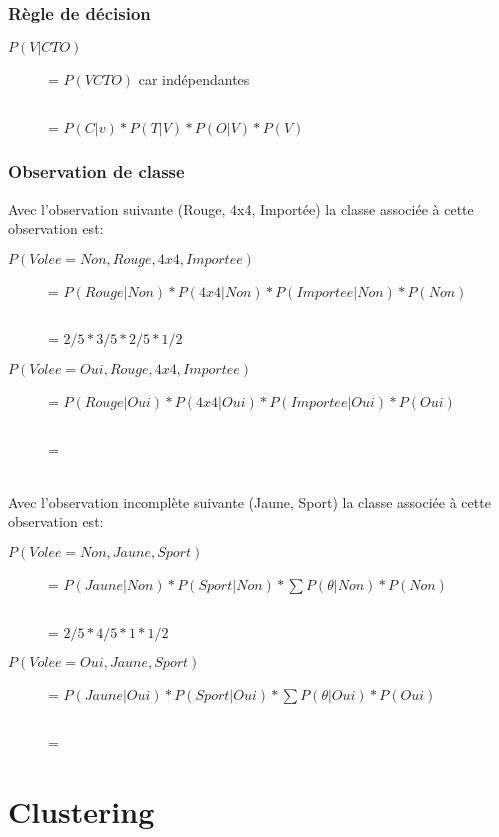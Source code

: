 \subsection{Règle de décision}
\begin{description}
\item[$P(V|CTO)$] = $P(VCTO)$ car indépendantes
\item[$        $] = $P(C|v)*P(T|V)*P(O|V)*P(V)$
\end{description}

\subsection{Observation de classe}
Avec l'observation suivante (Rouge, 4x4, Importée) la classe associée à cette observation est:
\begin{description}
\item[$P(Volee=Non,Rouge,4x4,Importee)$] = $P(Rouge|Non)*P(4x4|Non)*P(Importee|Non)*P(Non)$
\item[$                               $] = $2/5 * 3/5 * 2/5 * 1/2$
\end{description}
\begin{description}
\item[$P(Volee=Oui,Rouge,4x4,Importee)$] = $P(Rouge|Oui)*P(4x4|Oui)*P(Importee|Oui)*P(Oui)$
\item[$                               $] = $ $
\end{description}

\ \\
Avec l'observation incomplète suivante (Jaune, Sport) la classe associée à cette observation est:
\begin{description}
\item[$P(Volee=Non,Jaune,Sport)$] = $P(Jaune|Non)*P(Sport|Non)* \sum P(\theta|Non)*P(Non)$
\item[$                               $] = $2/5 * 4/5 * 1 * 1/2$
\end{description}
\begin{description}
\item[$P(Volee=Oui,Jaune,Sport)$] = $P(Jaune|Oui)*P(Sport|Oui)*\sum P(\theta|Oui)*P(Oui)$
\item[$                               $] = $ $
\end{description}
\pagebreak

\chapter{Clustering}
